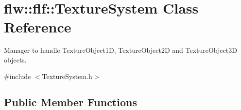 \hypertarget{classflw_1_1flf_1_1TextureSystem}{}\section{flw\+:\+:flf\+:\+:Texture\+System Class Reference}
\label{classflw_1_1flf_1_1TextureSystem}


Manager to handle Texture\+Object1D, Texture\+Object2D and Texture\+Object3D objects.  




{\ttfamily \#include $<$Texture\+System.\+h$>$}

\subsection*{Public Member Functions}
